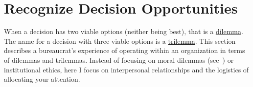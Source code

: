 \section{Recognize Decision Opportunities\label{sec:dilemma-trilemma}}



When a decision has two viable options (neither being best), that is a \href{https://en.wikipedia.org/wiki/Dilemma}{dilemma}. 
The name for a decision with three viable options is a \href{https://en.wikipedia.org/wiki/Trilemma}{trilemma}. 
This section describes a bureaucrat's experience of operating within an organization in terms of dilemmas and trilemmas. Instead of focusing on moral dilemmas (see~\cite{2017_Zacka}) or institutional ethics, here I focus on interpersonal relationships and the logistics of allocating your attention. 

